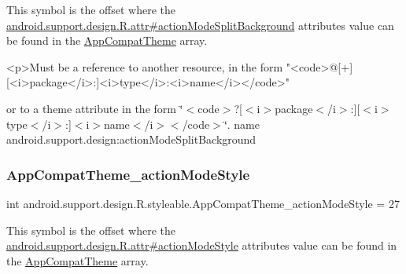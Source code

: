 This symbol is the offset where the \hyperlink{classandroid_1_1support_1_1design_1_1R_1_1attr_a23e600a698dd003c399ac9144d43cc86}{android.\+support.\+design.\+R.\+attr\#action\+Mode\+Split\+Background} attribute\textquotesingle{}s value can be found in the \hyperlink{classandroid_1_1support_1_1design_1_1R_1_1styleable_afb351dc8de20cbd4c89abe360373010c}{App\+Compat\+Theme} array.

\begin{DoxyVerb}      <p>Must be a reference to another resource, in the form "<code>@[+][<i>package</i>:]<i>type</i>:<i>name</i></code>"
\end{DoxyVerb}
 or to a theme attribute in the form \char`\"{}$<$code$>$?\mbox{[}$<$i$>$package$<$/i$>$\+:\mbox{]}\mbox{[}$<$i$>$type$<$/i$>$\+:\mbox{]}$<$i$>$name$<$/i$>$$<$/code$>$\char`\"{}.  name android.\+support.\+design\+:action\+Mode\+Split\+Background \mbox{\label{classandroid_1_1support_1_1design_1_1R_1_1styleable_a6065b230562d4a76f8d2d8990f30a339}} 
\subsubsection{\texorpdfstring{App\+Compat\+Theme\+\_\+action\+Mode\+Style}{AppCompatTheme\_actionModeStyle}}
{\footnotesize\ttfamily int android.\+support.\+design.\+R.\+styleable.\+App\+Compat\+Theme\+\_\+action\+Mode\+Style = 27\hspace{0.3cm}{\ttfamily [static]}}

This symbol is the offset where the \hyperlink{classandroid_1_1support_1_1design_1_1R_1_1attr_a586b72ccbb967f2df3c504d4bb611a90}{android.\+support.\+design.\+R.\+attr\#action\+Mode\+Style} attribute\textquotesingle{}s value can be found in the \hyperlink{classandroid_1_1support_1_1design_1_1R_1_1styleable_afb351dc8de20cbd4c89abe360373010c}{App\+Compat\+Theme} array.

